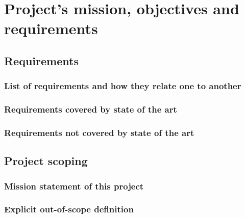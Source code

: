 \chapter{Project's mission, objectives and requirements}
\lipsum[1-2]

\section{Requirements}
\lipsum[1-2]
\subsection{List of requirements and how they relate one to another}
\subsection{Requirements covered by state of the art}
\subsection{Requirements not covered by state of the art}

\section{Project scoping}
\lipsum[1-2]
\subsection{Mission statement of this project}
\subsection{Explicit out-of-scope definition}
